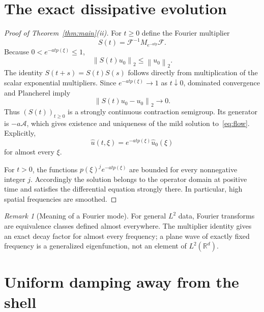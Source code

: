 \documentclass[11pt]{article}
\theoremstyle{remark}
\newtheorem{remark}[theorem]{Remark}
\newcommand{\R}{\mathbb{R}}
\newcommand{\sA}{\mathcal{A}}
\newcommand{\sF}{\mathcal{F}}
\newcommand{\norm}[1]{\left\lVert #1\right\rVert}
\begin{document}
\section{The exact dissipative evolution}

\begin{proof}[Proof of Theorem~\ref{thm:main}(ii)]
For $t\ge0$ define the Fourier multiplier
\begin{equation}\label{eq:S}
S(t)=\sF^{-1}M_{e^{-atp}}\sF.
\end{equation}
Because $0<e^{-atp(\xi)}\le1$,
\begin{equation}
\norm{S(t)u_0}_2\le\norm{u_0}_2.
\end{equation}
The identity $S(t+s)=S(t)S(s)$ follows directly from multiplication
of the scalar exponential multipliers.  Since
$e^{-atp(\xi)}\to1$ as $t\downarrow0$, dominated convergence and
Plancherel imply
\begin{equation}
\norm{S(t)u_0-u_0}_2\longrightarrow0.
\end{equation}
Thus $(S(t))_{t\ge0}$ is a strongly continuous contraction semigroup.
Its generator is $-a\sA$, which gives existence and uniqueness of the
mild solution to~\eqref{eq:flow}.  Explicitly,
\begin{equation}
\widehat u(t,\xi)=e^{-atp(\xi)}\widehat u_0(\xi)
\end{equation}
for almost every $\xi$.

For $t>0$, the functions $p(\xi)^j e^{-atp(\xi)}$ are bounded for
every nonnegative integer $j$.  Accordingly the solution belongs to the
operator domain at positive time and satisfies the differential equation
strongly there.  In particular, high spatial frequencies are smoothed.
\end{proof}

\begin{remark}[Meaning of a Fourier mode]
For general $L^2$ data, Fourier transforms are equivalence classes
defined almost everywhere.  The multiplier identity gives an exact
decay factor for almost every frequency; a plane wave of exactly fixed
frequency is a generalized eigenfunction, not an element of
$L^2(\R^d)$.
\end{remark}

\section{Uniform damping away from the shell}
\end{document}
